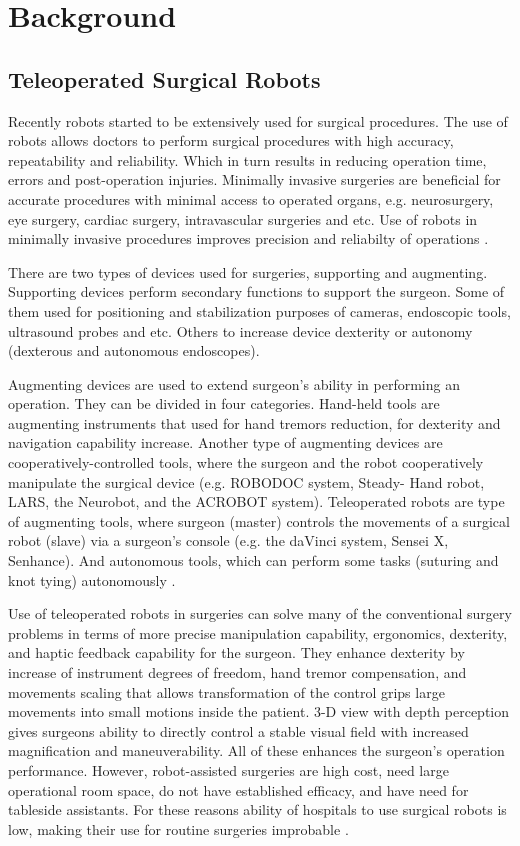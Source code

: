 \chapter{Background}
\label{back}

\section{Teleoperated Surgical Robots}
\label{sec:daVinci}
Recently robots started to be extensively used for surgical procedures. The use of robots allows doctors to perform surgical procedures with high accuracy, repeatability and reliability. Which in turn results in reducing operation time, errors and post-operation injuries. Minimally invasive surgeries are beneficial for accurate procedures with minimal access to operated organs, e.g. neurosurgery, eye surgery, cardiac surgery, intravascular surgeries and etc.  Use of robots in minimally invasive procedures improves precision and reliabilty of operations \cite{tavakoli_haptics_2008}.

There are two types of devices used for surgeries, supporting and augmenting. 
Supporting devices perform secondary functions to support the surgeon.  Some of them used for positioning and stabilization purposes of cameras, endoscopic tools, ultrasound probes and etc. Others to increase device dexterity or autonomy (dexterous and autonomous endoscopes).

Augmenting devices are used to extend surgeon's ability in performing an operation. They can be divided in four categories. Hand-held tools are augmenting instruments that used for hand tremors reduction, for dexterity and navigation capability increase. Another type of augmenting devices are cooperatively-controlled tools, where the surgeon and the robot cooperatively manipulate the surgical device (e.g. ROBODOC system, Steady- Hand robot, LARS, the Neurobot, and the ACROBOT system). Teleoperated robots are type of augmenting tools, where surgeon (master) controls the movements of a surgical robot (slave) via a surgeon's console (e.g. the daVinci system, Sensei X, Senhance). And autonomous tools, which can perform some tasks (suturing and knot tying) autonomously \cite{tavakoli_haptics_2008}.

Use of teleoperated robots in surgeries can solve many of the conventional surgery problems in terms of more precise manipulation capability, ergonomics, dexterity, and haptic feedback capability for the surgeon. They enhance dexterity by increase of instrument degrees of freedom, hand tremor compensation, and movements scaling that allows transformation of the control grips large movements into small motions inside the patient. 3-D view with depth perception gives surgeons ability to directly control a stable visual field with increased magnification and maneuverability. All of these enhances the surgeon's operation performance. However, robot-assisted surgeries are high cost, need large operational room space, do not have established efficacy, and have need for tableside assistants. For these reasons ability of hospitals to use surgical robots is low, making their use for routine surgeries improbable \cite{tavakoli_haptics_2008}.

